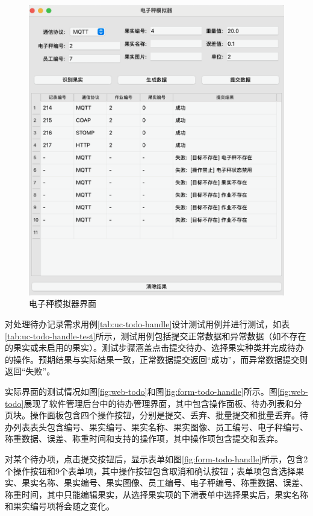 \begin{figure}
    \centering
    \includegraphics[width=0.9\linewidth]{../result/scale-simulator.png}
    \caption{电子秤模拟器界面}
    \label{fig:scale-simulator}
\end{figure}

对处理待办记录需求用例\ref{tab:uc-todo-handle}设计测试用例并进行测试，如表\ref{tab:uc-todo-handle-test}所示，测试用例包括提交正常数据和异常数据（如不存在的果实或未启用的果实）。测试步骤涵盖点击提交待办、选择果实种类并完成待办的操作。预期结果与实际结果一致，正常数据提交返回“成功”，而异常数据提交则返回“失败”。

实际界面的测试情况如图\ref{fig:web-todo}和图\ref{fig:form-todo-handle}所示。图\ref{fig:web-todo}展现了软件管理后台中的待办管理界面，其中包含操作面板、待办列表和分页块。操作面板包含四个操作按钮，分别是提交、丢弃、批量提交和批量丢弃。待办列表表头包含编号、果实编号、果实名称、果实图像、员工编号、电子秤编号、称重数据、误差、称重时间和支持的操作项，其中操作项包含提交和丢弃。

对某个待办项，点击提交按钮后，显示表单如图\ref{fig:form-todo-handle}所示，包含2个操作按钮和9个表单项，其中操作按钮包含取消和确认按钮；表单项包含选择果实、果实名称、果实编号、果实图像、员工编号、电子秤编号、称重数据、误差、称重时间，其中只能编辑果实，从选择果实项的下滑表单中选择果实后，果实名称和果实编号项将会随之变化。

